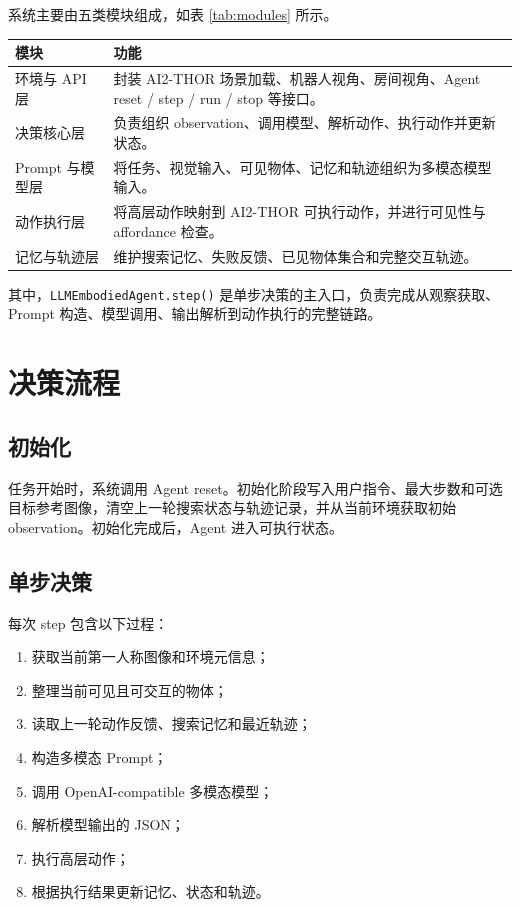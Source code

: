 \documentclass[UTF8,a4paper,12pt]{ctexart}
\begin{document}
系统主要由五类模块组成，如表 \ref{tab:modules} 所示。

\begin{center}
\begin{minipage}{0.95\textwidth}
\label{tab:modules}
\begin{tabularx}{\textwidth}{p{3.1cm}X}
\toprule
模块 & 功能 \\
\midrule
环境与 API 层 & 封装 AI2-THOR 场景加载、机器人视角、房间视角、Agent reset / step / run / stop 等接口。 \\
决策核心层 & 负责组织 observation、调用模型、解析动作、执行动作并更新状态。 \\
Prompt 与模型层 & 将任务、视觉输入、可见物体、记忆和轨迹组织为多模态模型输入。 \\
动作执行层 & 将高层动作映射到 AI2-THOR 可执行动作，并进行可见性与 affordance 检查。 \\
记忆与轨迹层 & 维护搜索记忆、失败反馈、已见物体集合和完整交互轨迹。 \\
\bottomrule
\end{tabularx}
\end{minipage}
\end{center}

其中，\texttt{LLMEmbodiedAgent.step()} 是单步决策的主入口，负责完成从观察获取、Prompt 构造、模型调用、输出解析到动作执行的完整链路。

\section{决策流程}

\subsection{初始化}

任务开始时，系统调用 Agent reset。初始化阶段写入用户指令、最大步数和可选目标参考图像，清空上一轮搜索状态与轨迹记录，并从当前环境获取初始 observation。初始化完成后，Agent 进入可执行状态。

\subsection{单步决策}

每次 step 包含以下过程：

\begin{enumerate}
    \item 获取当前第一人称图像和环境元信息；
    \item 整理当前可见且可交互的物体；
    \item 读取上一轮动作反馈、搜索记忆和最近轨迹；
    \item 构造多模态 Prompt；
    \item 调用 OpenAI-compatible 多模态模型；
    \item 解析模型输出的 JSON；
    \item 执行高层动作；
    \item 根据执行结果更新记忆、状态和轨迹。
\end{enumerate}
\end{document}
